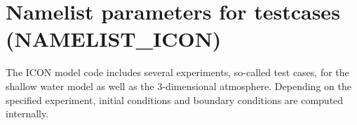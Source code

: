 %

%
%



\section{Namelist parameters for testcases (NAMELIST\_ICON)}

The ICON model code includes several experiments, so-called test cases,
for the shallow water model as well as the 3-dimensional atmosphere.
Depending on the specified experiment, initial conditions and boundary
conditions are computed internally.

